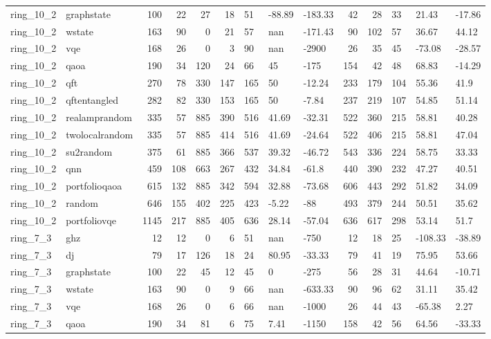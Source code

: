\begin{longtable}{llrrrrlllrrlll}
ring\_10\_2 & graphstate & 100 & 22 & 27 & 18 & 51 & -88.89 & -183.33 & 42 & 28 & 33 & 21.43 & -17.86 \\
ring\_10\_2 & wstate & 163 & 90 & 0 & 21 & 57 & nan & -171.43 & 90 & 102 & 57 & 36.67 & 44.12 \\
ring\_10\_2 & vqe & 168 & 26 & 0 & 3 & 90 & nan & -2900 & 26 & 35 & 45 & -73.08 & -28.57 \\
ring\_10\_2 & qaoa & 190 & 34 & 120 & 24 & 66 & 45 & -175 & 154 & 42 & 48 & 68.83 & -14.29 \\
ring\_10\_2 & qft & 270 & 78 & 330 & 147 & 165 & 50 & -12.24 & 233 & 179 & 104 & 55.36 & 41.9 \\
ring\_10\_2 & qftentangled & 282 & 82 & 330 & 153 & 165 & 50 & -7.84 & 237 & 219 & 107 & 54.85 & 51.14 \\
ring\_10\_2 & realamprandom & 335 & 57 & 885 & 390 & 516 & 41.69 & -32.31 & 522 & 360 & 215 & 58.81 & 40.28 \\
ring\_10\_2 & twolocalrandom & 335 & 57 & 885 & 414 & 516 & 41.69 & -24.64 & 522 & 406 & 215 & 58.81 & 47.04 \\
ring\_10\_2 & su2random & 375 & 61 & 885 & 366 & 537 & 39.32 & -46.72 & 543 & 336 & 224 & 58.75 & 33.33 \\
ring\_10\_2 & qnn & 459 & 108 & 663 & 267 & 432 & 34.84 & -61.8 & 440 & 390 & 232 & 47.27 & 40.51 \\
ring\_10\_2 & portfolioqaoa & 615 & 132 & 885 & 342 & 594 & 32.88 & -73.68 & 606 & 443 & 292 & 51.82 & 34.09 \\
ring\_10\_2 & random & 646 & 155 & 402 & 225 & 423 & -5.22 & -88 & 493 & 379 & 244 & 50.51 & 35.62 \\
ring\_10\_2 & portfoliovqe & 1145 & 217 & 885 & 405 & 636 & 28.14 & -57.04 & 636 & 617 & 298 & 53.14 & 51.7 \\
ring\_7\_3 & ghz & 12 & 12 & 0 & 6 & 51 & nan & -750 & 12 & 18 & 25 & -108.33 & -38.89 \\
ring\_7\_3 & dj & 79 & 17 & 126 & 18 & 24 & 80.95 & -33.33 & 79 & 41 & 19 & 75.95 & 53.66 \\
ring\_7\_3 & graphstate & 100 & 22 & 45 & 12 & 45 & 0 & -275 & 56 & 28 & 31 & 44.64 & -10.71 \\
ring\_7\_3 & wstate & 163 & 90 & 0 & 9 & 66 & nan & -633.33 & 90 & 96 & 62 & 31.11 & 35.42 \\
ring\_7\_3 & vqe & 168 & 26 & 0 & 6 & 66 & nan & -1000 & 26 & 44 & 43 & -65.38 & 2.27 \\
ring\_7\_3 & qaoa & 190 & 34 & 81 & 6 & 75 & 7.41 & -1150 & 158 & 42 & 56 & 64.56 & -33.33 \\

\end{longtable}
